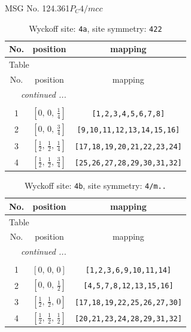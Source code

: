 \documentclass[fleqn,8pt]{jsarticle}
\begin{document}
\setcounter{MaxMatrixCols}{32}

\renewcommand{\tablename}{Table~}
\renewcommand{\figurename}{Figure~}
\begin{center}
\LARGE
MSG No. 124.361\quad$P_{C}4/mcc$
\end{center}
\renewcommand{\arraystretch}{1.2}
\begin{longtable}{ccc}
\caption{Wyckoff site: {\tt 4a}, site symmetry: {\tt 422}}
 \\
 \hline \hline
No. & position & mapping \\ \hline \endfirsthead

\multicolumn{2}{l}{\tablename\ \thetable{}} \\
 \hline \hline
No. & position & mapping \\ \hline \endhead

 \hline \hline
\multicolumn{2}{r}{\footnotesize\it continued ...} \\ \endfoot

 \hline \hline
\multicolumn{2}{r}{} \\ \endlastfoot

1 & $\left[ 0,\, 0,\, \frac{1}{4} \right]$ & {\tt [1,2,3,4,5,6,7,8]} \\ \hline
2 & $\left[ 0,\, 0,\, \frac{3}{4} \right]$ & {\tt [9,10,11,12,13,14,15,16]} \\ \hline
3 & $\left[ \frac{1}{2},\, \frac{1}{2},\, \frac{1}{4} \right]$ & {\tt [17,18,19,20,21,22,23,24]} \\ \hline
4 & $\left[ \frac{1}{2},\, \frac{1}{2},\, \frac{3}{4} \right]$ & {\tt [25,26,27,28,29,30,31,32]} \\
\end{longtable}
\renewcommand{\arraystretch}{1.2}
\begin{longtable}{ccc}
\caption{Wyckoff site: {\tt 4b}, site symmetry: {\tt 4/m..}}
 \\
 \hline \hline
No. & position & mapping \\ \hline \endfirsthead

\multicolumn{2}{l}{\tablename\ \thetable{}} \\
 \hline \hline
No. & position & mapping \\ \hline \endhead

 \hline \hline
\multicolumn{2}{r}{\footnotesize\it continued ...} \\ \endfoot

 \hline \hline
\multicolumn{2}{r}{} \\ \endlastfoot

1 & $\left[ 0,\, 0,\, 0 \right]$ & {\tt [1,2,3,6,9,10,11,14]} \\ \hline
2 & $\left[ 0,\, 0,\, \frac{1}{2} \right]$ & {\tt [4,5,7,8,12,13,15,16]} \\ \hline
3 & $\left[ \frac{1}{2},\, \frac{1}{2},\, 0 \right]$ & {\tt [17,18,19,22,25,26,27,30]} \\ \hline
4 & $\left[ \frac{1}{2},\, \frac{1}{2},\, \frac{1}{2} \right]$ & {\tt [20,21,23,24,28,29,31,32]} \\
\end{longtable}
\end{document}
